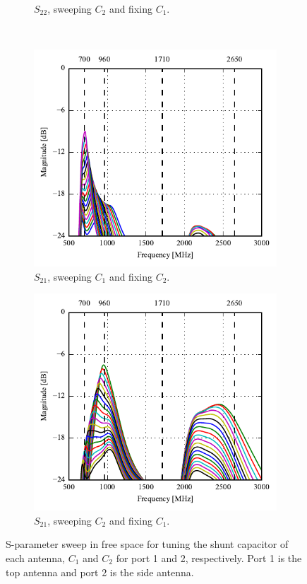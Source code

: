 \begin{figure}[htbp]
\begin{subfigure}[b]{0.49\linewidth}
        \caption{$S_{22}$, sweeping $C_2$ and fixing $C_1$.}
        \label{fig:ant1_6pf_s22}
    \end{subfigure}
~
    \begin{subfigure}[b]{0.49\linewidth}
        \centering
        \includegraphics{img/tech_sol/monopole/5mm/6pf_s11_s21}
        \caption{$S_{21}$, sweeping $C_1$ and fixing $C_2$.}
        \label{fig:ant1_6pf_s11}
    \end{subfigure}
    \hfill
    \begin{subfigure}[b]{0.49\linewidth}
        \centering
        \includegraphics{img/tech_sol/monopole/5mm/6pf_s22_s21}
        \caption{$S_{21}$, sweeping $C_2$ and fixing $C_1$.}
        \label{fig:ant1_6pf_s22}
    \end{subfigure}
    \caption{S-parameter sweep in free space for tuning the shunt capacitor of each antenna, $C_1$ and $C_2$ for port 1 and 2, respectively. Port 1 is the top antenna and port 2 is the side antenna.}
    \label{fig:sparam_mono_6pf_free_space}
\end{figure}

